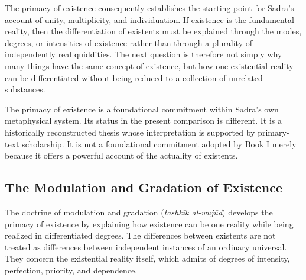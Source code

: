 \label{para:VS.B01.P01.C08.S17.SS05.P004}

The primacy of existence consequently
establishes the starting point
for Sadra's account of unity,
multiplicity, and individuation.
If existence is the fundamental
reality, then the differentiation
of existents must be explained
through the modes, degrees,
or intensities of existence
rather than through a plurality
of independently real quiddities.
The next question is therefore
not simply why many things have
the same concept of existence,
but how one existential reality
can be differentiated without
being reduced to a collection
of unrelated substances.

\label{para:VS.B01.P01.C08.S17.SS05.P005}

The primacy of existence is
a foundational commitment within
Sadra's own metaphysical system.
Its status in the present comparison
is different. It is a historically
reconstructed thesis whose
interpretation is supported
by primary-text scholarship.
It is not a foundational commitment
adopted by Book I merely because
it offers a powerful account
of the actuality of existents.




\subsection{The Modulation and Gradation of Existence}
\label{subsec:ch08_s17_ss06}

\label{para:VS.B01.P01.C08.S17.SS06.P001}

The doctrine of modulation and gradation
(\textit{tashkīk al-wujūd}) develops
the primacy of existence by explaining
how existence can be one reality
while being realized in differentiated
degrees. The differences between
existents are not treated as
differences between independent
instances of an ordinary universal.
They concern the existential
reality itself, which admits
of degrees of intensity,
perfection, priority, and dependence.

\label{para:VS.B01.P01.C08.S17.SS06.P002}

